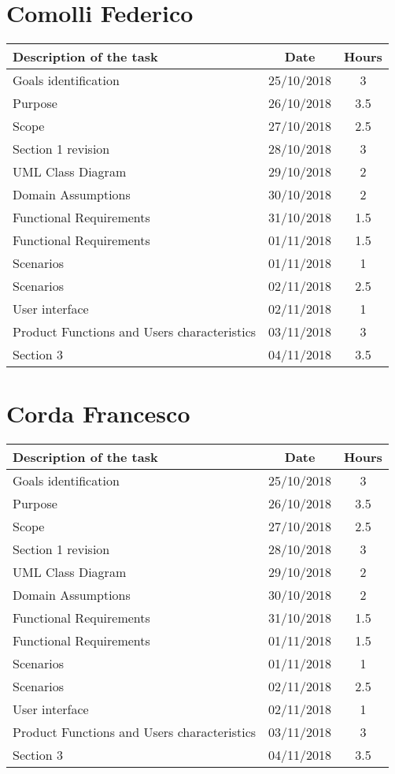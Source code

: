 \section{Comolli Federico}
\begin{center}
\begin{tabular}{l c c}
{\bf Description of the task}&{\bf Date}&{\bf Hours}\\ \hline
Goals identification & {25/10/2018} & {3} \\ \hline
Purpose & {26/10/2018} & {3.5} \\ \hline
Scope & {27/10/2018} & {2.5} \\ \hline
Section 1 revision & {28/10/2018} & {3} \\ \hline
UML Class Diagram & {29/10/2018} & {2} \\ \hline
Domain Assumptions & {30/10/2018} & {2} \\ \hline
Functional Requirements & {31/10/2018} & {1.5} \\ \hline
Functional Requirements & {01/11/2018} & {1.5} \\ \hline
Scenarios & {01/11/2018} & {1} \\ \hline
Scenarios & {02/11/2018} & {2.5} \\ \hline
User interface & {02/11/2018} & {1} \\ \hline
Product Functions and Users characteristics & {03/11/2018} & {3} \\ \hline
Section 3 & {04/11/2018} & {3.5} \\ \hline
\end{tabular}
\end{center}

\section{Corda Francesco}
\begin{center}
\begin{tabular}{l c c}
{\bf Description of the task}&{\bf Date}&{\bf Hours}\\ \hline
Goals identification & {25/10/2018} & {3} \\ \hline
Purpose & {26/10/2018} & {3.5} \\ \hline
Scope & {27/10/2018} & {2.5} \\ \hline
Section 1 revision & {28/10/2018} & {3} \\ \hline
UML Class Diagram & {29/10/2018} & {2} \\ \hline
Domain Assumptions & {30/10/2018} & {2} \\ \hline
Functional Requirements & {31/10/2018} & {1.5} \\ \hline
Functional Requirements & {01/11/2018} & {1.5} \\ \hline
Scenarios & {01/11/2018} & {1} \\ \hline
Scenarios & {02/11/2018} & {2.5} \\ \hline
User interface & {02/11/2018} & {1} \\ \hline
Product Functions and Users characteristics & {03/11/2018} & {3} \\ \hline
Section 3 & {04/11/2018} & {3.5} \\ \hline
\end{tabular}
\end{center}